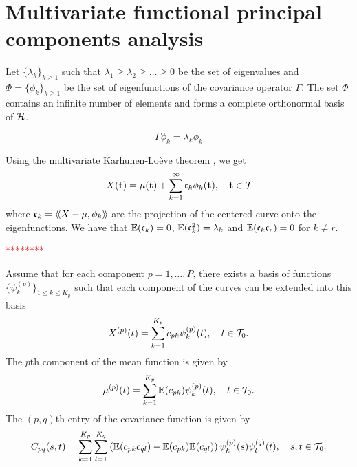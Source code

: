 \section{Multivariate functional principal components analysis} %
\label{sec:functional_principal_components_analysis}


Let $\{\lambda_k\}_{k \geq 1}$ such that $\lambda_1 \geq \lambda_2 \geq \dots \geq 0$ be the set of eigenvalues and $\Phi = \{\phi_k\}_{k \geq 1}$ be the set of eigenfunctions of the covariance operator $\Gamma$. The set $\Phi$ contains an infinite number of elements and forms a complete orthonormal basis of $\mathcal{H}$.

\begin{equation}\label{eq:eigendecomposition}
    \Gamma \phi_k = \lambda_k \phi_k
\end{equation}

Using the multivariate Karhunen-Loève theorem \cite{happMultivariateFunctionalPrincipal2015}, we get
\begin{equation}
    X(\mathbf{t}) = \mu(\mathbf{t}) + \sum_{k = 1}^\infty \mathfrak{c}_k \phi_k(\mathbf{t}), \quad \mathbf{t} \in \mathcal{T}_{}
\end{equation}
where $\mathfrak{c}_{k} = \langle\!\langle X - \mu, \phi_k\rangle\!\rangle$ are the projection of the centered curve onto the eigenfunctions. We have that $\mathbb{E}(\mathfrak{c}_{k}) = 0$, $\mathbb{E}(\mathfrak{c}_{k}^2) = \lambda_k$ and $\mathbb{E}(\mathfrak{c}_{k}\mathfrak{c}_{r}) = 0$ for $k \neq r$.

\textcolor{red}{********}

Assume that for each component $p = 1, \dots, P$, there exists a basis of functions $\{\psi_k^{(p)}\}_{1 \leq k \leq K_p}$ such that each component of the curves can be extended into this basis
\begin{equation}
X^{(p)}(t) = \sum_{k = 1}^{K_p} c_{pk}\psi_k^{(p)}(t), \quad t \in \mathcal{T}_{0}.
\end{equation} 
The $p$th component of the mean function is given by
\begin{equation}
    \mu^{(p)}(t) = \sum_{k = 1}^{K_p} \mathbb{E}(c_{pk})\psi_k^{(p)}(t), \quad t \in \mathcal{T}_{0}.
\end{equation}
The $(p, q)$th entry of the covariance function is given by
\begin{equation}
    C_{pq}(s, t) = \sum_{k = 1}^{K_p} \sum_{l = 1}^{K_q} \left(\mathbb{E}(c_{pk} c_{ql}) - \mathbb{E}(c_{pk})\mathbb{E}(c_{ql})\right)\psi_k^{(p)}(s)\psi_l^{(q)}(t), \quad s, t \in \mathcal{T}_{0}.
\end{equation}

